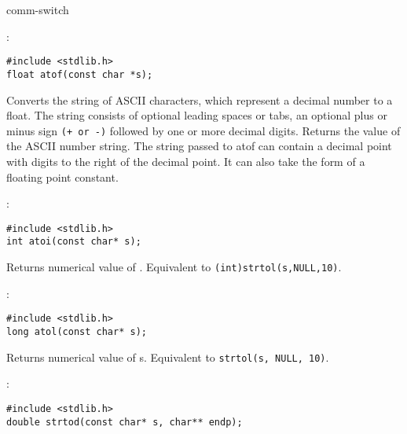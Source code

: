 \begin{Ventry2}{comm-switch  }

\item[atof]
\label{item:atof}
:

\begin{production}
\begin{verbatim}
#include <stdlib.h>
float atof(const char *s);
\end{verbatim}
\end{production}


Converts the string of ASCII characters, which represent a decimal
number to a float.  The string consists of optional leading spaces or
tabs, an optional plus or minus sign \verb!(+ or -)!
 followed by one or more decimal digits.  Returns the
value of the ASCII number string.  The string passed to
atof can contain a decimal point with digits to the right of
the decimal point.  It can also take the form of a floating
point constant.


\item[atoi]
\label{item:atoi}
:
\begin{production}
\begin{verbatim}
#include <stdlib.h>
int atoi(const char* s);
\end{verbatim}
\end{production}

     Returns numerical value of . Equivalent to 
     \verb+(int)strtol(s,NULL,10)+.



\item[atol]
\label{item:atol}
:
\begin{production}
\begin{verbatim}
#include <stdlib.h>     
long atol(const char* s);
\end{verbatim}
\end{production}

     Returns numerical value of s. Equivalent to \verb+strtol(s, NULL, 10)+.

\item[strtod]
\label{item:strtod}
:
\begin{production}
\begin{verbatim}
#include <stdlib.h>
double strtod(const char* s, char** endp);
\end{verbatim}
\end{production}


\end{Ventry2}
